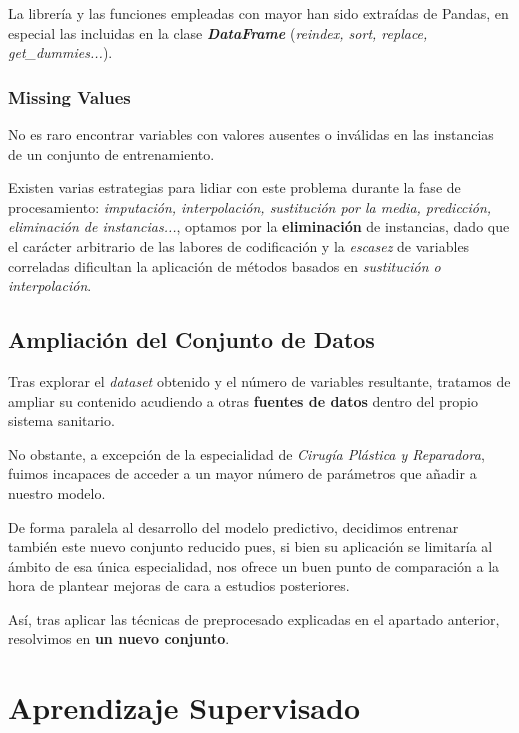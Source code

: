  La librería y las funciones empleadas con mayor han sido extraídas de Pandas\cite{McKinney2010DataPython}, en especial las incluidas en la clase \textit{\textbf{DataFrame}} (\textit{reindex, sort, replace, get\_dummies...})\cite{VanderPlas2016PythonData}.

\subsubsection{Missing Values}

No es raro encontrar variables con valores ausentes o inválidas en las instancias de un conjunto de entrenamiento.

Existen varias estrategias\cite{Emmanuel2021ALearning} para lidiar con este problema durante la fase de procesamiento: \textit{imputación, interpolación, sustitución por la media, predicción, eliminación de instancias...}, optamos por la \textbf{eliminación} de instancias, dado que el carácter arbitrario de las labores de codificación y la \textit{escasez} de variables correladas dificultan la aplicación de métodos basados en \textit{sustitución o interpolación}. 


 \subsection{Ampliación del Conjunto de Datos}

 Tras explorar el \textit{dataset} obtenido y el número de variables resultante, tratamos de ampliar su contenido acudiendo a otras \textbf{fuentes de datos} dentro del propio sistema sanitario.

 No obstante, a excepción de la especialidad de \textit{Cirugía Plástica y Reparadora}, fuimos incapaces de acceder a un mayor número de parámetros que añadir a nuestro modelo.

 De forma paralela al desarrollo del modelo predictivo, decidimos entrenar también este nuevo conjunto reducido pues, si bien su aplicación se limitaría al ámbito de esa única especialidad, nos ofrece un buen punto de comparación a la hora de plantear mejoras de cara a estudios posteriores.

 Así, tras aplicar las técnicas de preprocesado explicadas en el apartado anterior, resolvimos en \textbf{un nuevo conjunto}.



\newpage

\section{Aprendizaje Supervisado}


